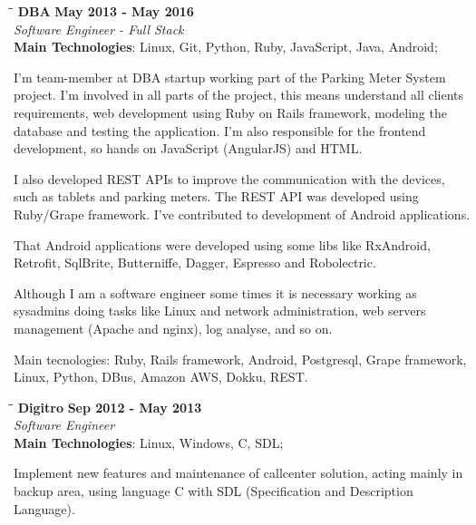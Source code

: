 \documentclass[margin]{res}
\begin{document}
\begin{resume}
\vspace{-0.1in}
   \begin{tabbing}
   \hspace{2.3in}\= \hspace{1.7in}\= \kill %
    \textbf{DBA}    \>\>\textbf{May 2013 - May 2016}\\
    \textit{Software Engineer - Full Stack}\\        
    \textbf{Main Technologies}: Linux, Git, Python, Ruby, JavaScript, Java, Android;
   \end{tabbing}\vspace{-20pt}      %
    \vspace{2mm}
I'm team-member at DBA startup working part of the Parking Meter System project. I'm involved in all parts of the project, this means understand all clients requirements, web development using Ruby on Rails framework, modeling the database and testing the application. I'm also responsible for the frontend development, so hands on JavaScript (AngularJS) and HTML.

I also developed REST APIs to improve the communication with the devices, such as tablets and parking meters. The REST API was developed using Ruby/Grape framework. I've contributed to development of Android applications.

That Android applications were developed using some libs like RxAndroid, Retrofit, SqlBrite, Butterniffe, Dagger, Espresso and Robolectric.

Although I am a software engineer some times it is necessary working as sysadmins doing tasks like Linux and network administration, web servers management (Apache and nginx), log analyse, and so on.

Main tecnologies: Ruby, Rails framework, Android, Postgresql, Grape framework, Linux, Python, DBus, Amazon AWS, Dokku, REST.

\vspace{-0.1in}
   \begin{tabbing}
   \hspace{2.3in}\= \hspace{1.7in}\= \kill %
    \textbf{Digitro}    \>\>\textbf{Sep 2012 - May 2013}\\
    \textit{Software Engineer}\\        
    \textbf{Main Technologies}: Linux, Windows, C, SDL;
   \end{tabbing}\vspace{-20pt}      %
    \vspace{2mm}
Implement new features and maintenance of callcenter solution, acting mainly
in backup area, using language C with SDL (Specification and Description Language).


\end{resume}
\end{document}
